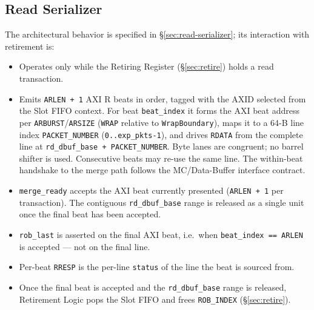 \subsection{Read Serializer}
The architectural behavior is specified in \S\ref{sec:read-serializer}; its
interaction with retirement is:
\begin{itemize}[noitemsep]
  \item Operates only while the Retiring Register (\S\ref{sec:retire}) holds a read transaction.
  \item Emits \texttt{ARLEN + 1} AXI R beats in order, tagged with the AXID selected from the Slot FIFO context.  For beat \texttt{beat\_index} it forms the AXI beat address per \texttt{ARBURST}/\texttt{ARSIZE} (\texttt{WRAP} relative to \texttt{WrapBoundary}), maps it to a 64-B line index \texttt{PACKET\_NUMBER} (\texttt{0..exp\_pkts-1}), and drives \texttt{RDATA} from the complete line at \texttt{rd\_dbuf\_base + PACKET\_NUMBER}.  Byte lanes are congruent; no barrel shifter is used.  Consecutive beats may re-use the same line.  The within-beat handshake to the merge path follows the MC/Data-Buffer interface contract.
  \item \texttt{merge\_ready} accepts the AXI beat currently presented (\texttt{ARLEN + 1} per transaction).  The contiguous \texttt{rd\_dbuf\_base} range is released as a single unit once the final beat has been accepted.
  \item \texttt{rob\_last} is asserted on the final AXI beat, i.e.\ when \texttt{beat\_index == ARLEN} is accepted --- not on the final line.
  \item Per-beat \texttt{RRESP} is the per-line \texttt{status} of the line the beat is sourced from.
  \item Once the final beat is accepted and the \texttt{rd\_dbuf\_base} range is released, Retirement Logic pops the Slot FIFO and frees \texttt{ROB\_INDEX} (\S\ref{sec:retire}).
\end{itemize}

